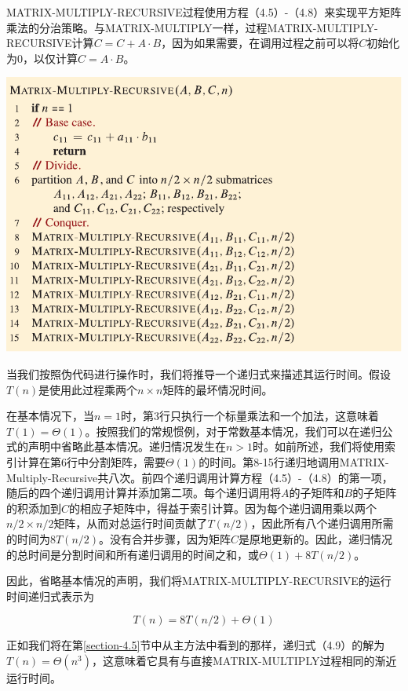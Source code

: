 \documentclass[lang=cn,newtx,10pt,scheme=chinese]{elegantbook}
\begin{document}
MATRIX-MULTIPLY-RECURSIVE过程使用方程（4.5）-（4.8）来实现平方矩阵乘法的分治策略。与MATRIX-MULTIPLY一样，过程MATRIX-MULTIPLY-RECURSIVE计算$C=C+A \cdot B$，因为如果需要，在调用过程之前可以将$C$初始化为0，以仅计算$C=A \cdot B$。

\includegraphics{算法导论第四版插图/第四章/递归矩阵相乘算法.pdf}

当我们按照伪代码进行操作时，我们将推导一个递归式来描述其运行时间。假设$T(n)$是使用此过程乘两个$n \times n$矩阵的最坏情况时间。

在基本情况下，当$n=1$时，第3行只执行一个标量乘法和一个加法，这意味着$T(1)=\Theta(1)$。按照我们的常规惯例，对于常数基本情况，我们可以在递归公式的声明中省略此基本情况。递归情况发生在$n>1$时。如前所述，我们将使用索引计算在第6行中分割矩阵，需要$\Theta(1)$的时间。第8-15行递归地调用MATRIX-Multiply-Recursive共八次。前四个递归调用计算方程（4.5）-（4.8）的第一项，随后的四个递归调用计算并添加第二项。每个递归调用将$A$的子矩阵和$B$的子矩阵的积添加到$C$的相应子矩阵中，得益于索引计算。因为每个递归调用乘以两个$n/2 \times n/2$矩阵，从而对总运行时间贡献了$T(n/2)$，因此所有八个递归调用所需的时间为$8 T(n/2)$。没有合并步骤，因为矩阵$C$是原地更新的。因此，递归情况的总时间是分割时间和所有递归调用的时间之和，或$\Theta(1)+8 T(n / 2)$。

因此，省略基本情况的声明，我们将MATRIX-MULTIPLY-RECURSIVE的运行时间递归式表示为

\begin{equation}
T(n)=8 T(n / 2)+\Theta(1)
\end{equation}

正如我们将在第\ref{section-4.5}节中从主方法中看到的那样，递归式（4.9）的解为$T(n)=\Theta\left(n^3\right)$，这意味着它具有与直接MATRIX-MULTIPLY过程相同的渐近运行时间。
\end{document}
